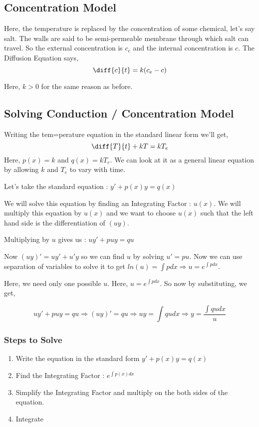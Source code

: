 \subsection{Concentration Model}

Here, the temperature is replaced by the concentration of some chemical, let's say salt.
The walls are said to be semi-permeable membrane through which salt can travel.
So the external concentration is $c_e$ and the internal concentration is $c$.
The Diffusion Equation says,
$$ \diff{c}{t} = k(c_e - c) $$

Here, $k > 0$ for the same reason as before.

\subsection{Solving Conduction / Concentration Model}

Writing the tem=perature equation in the standard linear form we'll get,
$$ \diff{T}{t} + kT = kT_e $$
Here, $p(x) = k$ and $q(x) = kT_e $.
We can look at it as a general linear equation by allowing $k$ and $T_e$ to vary with time.

Let's take the standard equation : $ y' + p(x) y = q(x) $

We will solve this equation by finding an Integrating Factor : $u(x)$.
We will multiply this equation by $u(x)$ and we want to choose $u(x)$ such that the left hand side is the differentiation of $(uy)$.

Multiplying by $u$ gives us : $uy' + puy = qu$

Now $(uy)' = uy' + u'y$ so we can find $u$ by solving $u' = pu$.
Now we can use separation of variables to solve it to get $ln(u) = \int p dx \Rightarrow u = e^{\int p dx}$.

Here, we need only one possible $u$.
Here, $u = e^{\int p dx}$.
So now by substituting, we get,

$$
	uy' + puy = qu \Rightarrow
	(uy)' = qu \Rightarrow
	uy = \int qu dx \Rightarrow
	y = \frac{\int qu dx}{u}
$$

\subsubsection{Steps to Solve}

\begin{enumerate}
	\item Write the equation in the standard form $y' + p(x)y = q(x)$
	\item Find the Integrating Factor : $e^{\int p(x) dx}$
	\item Simplify the Integrating Factor and multiply on the both sides of the equation.
	\item Integrate
\end{enumerate}

